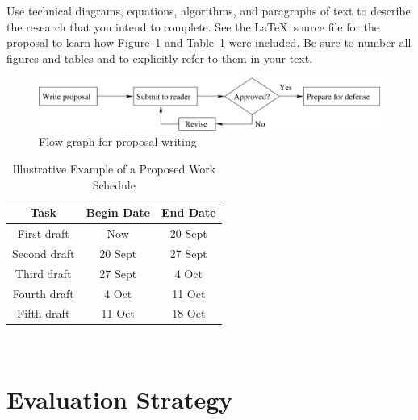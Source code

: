 \documentclass[11pt]{article}
\begin{document}

Use technical diagrams, equations, algorithms, and paragraphs of text to
describe the research that you intend to complete. See the \LaTeX\ source file
for the proposal to learn how Figure~\ref{intro-fig1} and Table~\ref{intro-tab1}
were included. Be sure to number all figures and tables and to explicitly refer
to them in your text.

\begin{figure}[htbp]
  \centering
  \includegraphics[width=5in]{flow.pdf}
  \caption{Flow graph for proposal-writing}
  \label{intro-fig1}
\end{figure}

\begin{table}[htbp]
  \centering
  \begin{tabular}{|c||c|c|}
    \hline

    \bf Task     & \bf Begin Date & \bf End Date \\ \hline\hline
    First draft  & Now            & 20 Sept      \\ \hline
    Second draft & 20 Sept        & 27 Sept      \\ \hline
    Third draft  & 27 Sept        & 4 Oct        \\ \hline
    Fourth draft & 4 Oct          & 11 Oct       \\ \hline
    Fifth draft  & 11 Oct         & 18 Oct       \\ \hline

  \end{tabular}
  \caption{Illustrative Example of a Proposed Work Schedule}~\label{intro-tab1}
\end{table}

\section{Evaluation Strategy}
\label{sec:evaluate}

\end{document}
